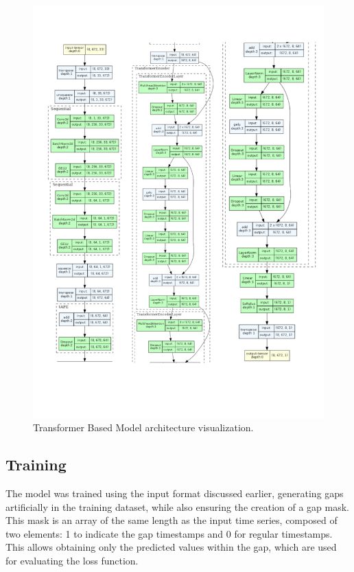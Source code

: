 \begin{figure}[H]
	\centering
	\includegraphics[height=\textheight]{chapters/3_models/imgs/gab/transformerarchitecture.png}
	\caption{Transformer Based Model architecture visualization.}\label{fig:gabarchitecture}
\end{figure}

\subsection{Training}
The model was trained using the input format discussed earlier,
generating gaps artificially in the training dataset, while also ensuring the
creation of a gap mask.
This mask is an array of the same length as the input time series,
composed of two elements: 1 to indicate the gap timestamps and 0 for regular timestamps.
This allows obtaining only the predicted values within the gap,
which are used for evaluating the loss function.

